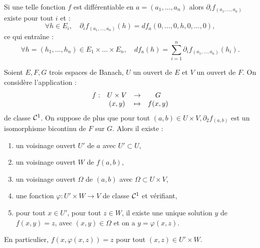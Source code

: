 \begin{rmq}
Si une telle fonction $f$ est différentiable en $a=(a_1, \dots, a_n)$ alors $\partial_i f_{(a_1, \dots, a_n)}$ existe pour tout $i$ et :
\[ \forall h \in E_i, \quad \partial_i f_{(a_1, \dots, a_n)}(h) = df_a(0, \dots, 0, h, 0, \dots, 0) , \]
ce qui entraîne :
\[ \forall h=(h_1, \dots, h_n) \in E_1 \times \dots \times E_n, \quad df_a(h) = \sum_{i=1}^n \partial_i f_{(a_1, \dots, a_n)}(h_i) . \]
\end{rmq}

\begin{thm}
Soient $E, F, G$ trois espaces de Banach, $U$ un ouvert de $E$ et $V$ un ouvert de $F$.
On considère l'application :
\[ \begin{array}{c c c c}
f : & U \times V & \to & G \\
& (x,y) & \mapsto & f(x,y)
\end{array} \]
de classe $\mathcal{C}^1$. On suppose de plus que pour tout $(a,b) \in U \times V, \partial_2 f_{(a,b)}$ est un isomorphisme bicontinu de $F$ sur
$G$. Alors il existe :
\begin{enumerate}[label=(\roman*)]
\item un voisinage ouvert $U'$ de $a$ avec $U' \subset U$,
\item un voisinage ouvert $W$ de $f(a,b)$,
\item un voisinage ouvert $\Omega$ de $(a,b)$ avec $\Omega \subset U \times V$,
\item une fonction $\varphi : U' \times W \to V$ de classe $\mathcal{C}^1$ et vérifiant,
\item pour tout $x \in U'$, pour tout $z \in W$, il existe une unique solution $y$ de $f(x,y)=z$, 
avec $(x,y) \in \Omega$ et on a $y=\varphi(x,z)$.
\end{enumerate}
En particulier, $f(x, \varphi(x,z))=z$ pour tout $(x,z) \in U' \times W$.
\end{thm}

